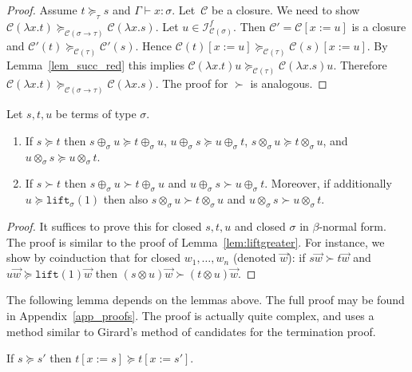 \documentclass[a4paper,UKenglish,cleveref,autoref,numberwithinsect]{lipics-v2019}
\theoremstyle{definition}
\newcommand{\Iterms}{\mathcal{I}}
\newcommand{\arrtype}{\rightarrow}
\newcommand{\subst}[2]{#1:=#2}
\newcommand{\abs}[2]{\lambda #1.#2}
\newcommand{\lift}{\mathtt{lift}}
\newcommand{\cl}{\mathcal{C}}
\newcommand{\proves}{\vdash}
\begin{document}
\begin{proof}
  Assume $t \succeq_\tau s$ and $\Gamma \proves x : \sigma$. Let~$\cl$
  be a closure. We need to show
  $\cl(\abs{x}{t}) \succeq_{\cl(\sigma\arrtype\tau)}
  \cl(\abs{x}{s})$. Let $u \in \Iterms^f_{\cl(\sigma)}$. Then
  $\cl' = \cl[\subst{x}{u}]$ is a closure and
  $\cl'(t) \succeq_{\cl(\tau)} \cl'(s)$. Hence
  $\cl(t)[\subst{x}{u}] \succeq_{\cl(\tau)} \cl(s)[\subst{x}{u}]$. By
  Lemma~\ref{lem_succ_red} this implies
  $\cl(\abs{x}{t}) u \succeq_{\cl(\tau)} \cl(\abs{x}{s}) u$. Therefore
  $\cl(\abs{x}{t}) \succeq_{\cl(\sigma\arrtype\tau)}
  \cl(\abs{x}{s})$. The proof for $\succ$ is analogous.
\end{proof}

\begin{lemma}\label{lem:plustimesmonotonic}
  Let $s,t,u$ be terms of type $\sigma$.
  \begin{enumerate}
  \item If $s \succeq t$ then $s \oplus_\sigma u \succeq t
    \oplus_\sigma u$, $u \oplus_\sigma s \succeq u \oplus_\sigma t$,
    $s \otimes_\sigma u \succeq t \otimes_\sigma u$, and $u
    \otimes_\sigma s \succeq u \otimes_\sigma t$.
  \item If $s \succ t$ then $s \oplus_\sigma u \succ t \oplus_\sigma
    u$ and $u \oplus_\sigma s \succ u \oplus_\sigma t$. Moreover, if
    additionally $u \succeq \lift_\sigma(1)$ then also $s
    \otimes_\sigma u \succ t \otimes_\sigma u$ and $u \otimes_\sigma s
    \succ u \otimes_\sigma t$.
  \end{enumerate}
\end{lemma}

\begin{proof}
  It suffices to prove this for closed $s,t,u$ and closed $\sigma$ in
  $\beta$-normal form. The proof is similar to the proof of
  Lemma~\ref{lem:liftgreater}. For instance, we show by coinduction
  that for closed $w_1,\ldots,w_n$ (denoted $\vec{w}$): if
  $s \vec{w} \succ t \vec{w}$ and $u \vec{w} \succeq \lift(1) \vec{w}$
  then $(s \otimes u) \vec{w} \succ (t \otimes u) \vec{w}$.
\end{proof}

The following lemma depends on the lemmas above. The full proof may be
found in Appendix~\ref{app_proofs}. The proof is actually quite
complex, and uses a method similar to Girard's method of candidates
for the termination proof.

\begin{lemma}\label{lem_succeq_subst}
  If $s \succeq s'$ then $t[\subst{x}{s}] \succeq t[\subst{x}{s'}]$.
\end{lemma}
\end{document}
